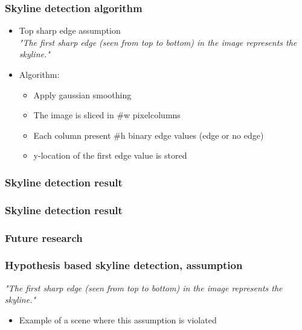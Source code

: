 \documentclass{beamer}
\begin{document}
\frame
{
	\frametitle{Skyline detection algorithm}%
	\begin{itemize}
		\item <+-| alert@+> Top sharp edge assumption\\
		\emph{"The first sharp edge (seen from top to bottom) in the image represents the skyline."}
		\item <+-| alert@+> Algorithm:
			\begin{itemize}
			\item <+-| alert@+> Apply gaussian smoothing
			\item <+-| alert@+> The image is sliced in \#w pixelcolumns
			\item <+-| alert@+> Each column present \#h binary edge values (edge or no edge)
			\item <+-| alert@+> y-location of the first edge value is stored 
			\end{itemize}
	\end{itemize}
}



\frame
{
	\frametitle{Skyline detection result}%
}

\frame
{
	\frametitle{Skyline detection result}%
}

\frame
{
	\frametitle{Future research}
}

\frame
{
	\frametitle{Hypothesis based skyline detection, assumption}
	\emph{"The first sharp edge (seen from top to bottom) in the image represents the skyline."}
	\begin{itemize}
	\item <+-| alert@+> Example of a scene where this assumption is violated
	\end{itemize}
}
\end{document}

